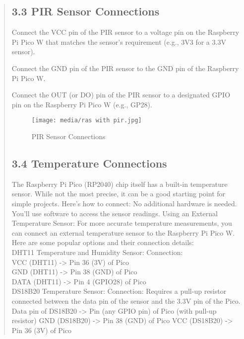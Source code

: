 \documentclass[12pt]{report}
\begin{document}
\begin{quote}
		\clearpage
		
		
		\subsection{3.3 PIR Sensor Connections}
		Connect the VCC pin of the PIR sensor to a voltage pin on the Raspberry Pi Pico W that matches the sensor's requirement (e.g., 3V3 for a 3.3V sensor).
		
		Connect the GND pin of the PIR sensor to the GND pin of the Raspberry Pi Pico W.
		
		Connect the OUT (or DO) pin of the PIR sensor to a designated GPIO pin on the Raspberry Pi Pico W (e.g., GP28).
			
			\begin{figure}
				\centering
				\texttt{[image: media/ras with pir.jpg]}\\
				\caption{PIR Sensor Connections}
			\end{figure}
			
		\clearpage
		
		
		
		\subsection{3.4 Temperature Connections}
		The Raspberry Pi Pico (RP2040) chip itself has a built-in temperature sensor. While not the most precise, it can be a good starting point for simple projects. Here's how to connect:
		No additional hardware is needed.
		You'll use software to access the sensor readings.
		Using an External Temperature Sensor:
		For more accurate temperature measurements, you can connect an external temperature sensor to the Raspberry Pi Pico W. Here are some popular options and their connection details:\\
		
		DHT11 Temperature and Humidity Sensor:
		Connection:\\
		VCC (DHT11) -> Pin 36 (3V) of Pico\\
		GND (DHT11) -> Pin 38 (GND) of Pico\\
		DATA (DHT11) -> Pin 4 (GPIO28) of Pico\\
		
		DS18B20 Temperature Sensor:
		Connection:
		Requires a pull-up resistor connected between the data pin of the sensor and the 3.3V pin of the Pico.
		Data pin of DS18B20 -> Pin (any GPIO pin) of Pico (with pull-up resistor)
		GND (DS18B20) -> Pin 38 (GND) of Pico
		VCC (DS18B20) -> Pin 36 (3V) of Pico
		

\end{quote}
\end{document}
